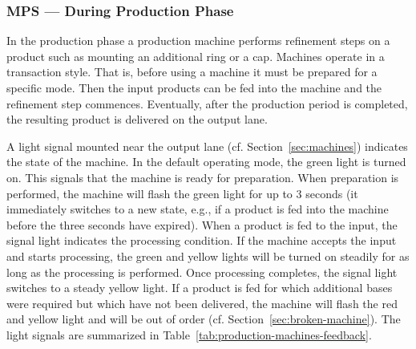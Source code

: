 \documentclass[12pt,twoside]{article}
\newcommand{\refsec}[1]{Section~\ref{#1}}
\newcommand{\reftab}[1]{Table~\ref{#1}}
\begin{document}
\subsubsection{MPS --- During Production Phase}
\label{sec:production-machines-production}
In the production phase a production machine performs refinement steps on
a product such as mounting an additional ring or a cap. Machines
operate in a transaction style. That is, before using a machine it
must be prepared for a specific mode. Then the input products can be fed
into the machine and the refinement step commences. Eventually, after
the production period is completed, the resulting product is delivered
on the output lane.

A light signal mounted near the output lane
(cf. \refsec{sec:machines}) indicates the state of the machine. In the
default operating mode, the green light is turned on. This signals
that the machine is ready for preparation. When preparation is performed,
the machine will flash the green light for up to 3 seconds (it
immediately switches to a new state, e.g., if a product is fed into the
machine before the three seconds have expired). When a product is fed
to the input, the signal light indicates the processing condition. If
the machine accepts the input and starts processing, the green and yellow lights
will be turned on steadily for as long as the processing is
performed. Once processing completes, the signal light switches to a
steady yellow light. If a product is fed for which additional bases
were required but which have not been delivered, the machine will
flash the red and yellow light and will be out of order
(cf. \refsec{sec:broken-machine}). The light signals are summarized in
\reftab{tab:production-machines-feedback}.
\end{document}

